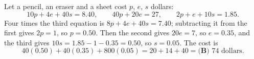 Let a pencil, an eraser and a sheet cost $p$, $e$, $s$ dollars:
\[10p+4e+40s=8.40,\qquad40p+20e=27,\qquad2p+e+10s=1.85.\]
Four times the third equation is $8p+4e+40s=7.40$; subtracting it from the first gives $2p=1$, so $p=0.50$. Then the second gives $20e=7$, so $e=0.35$, and the third gives $10s=1.85-1-0.35=0.50$, so $s=0.05$. The cost is
\[40(0.50)+40(0.35)+800(0.05)=20+14+40=\boxed{\textbf{(B) }74}\text{ dollars}.\]

